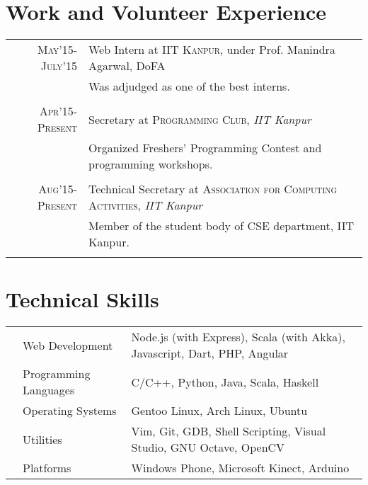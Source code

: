 \documentclass[11pt,a4paper]{article}
\begin{document}
\vspace{-0.6cm}
\section*{Work and Volunteer Experience}
\vspace{-0.2cm}
\bgroup
\def\arraystretch{0.6}
\begin{tabular}{r|p{20cm}}
\textsc{May'15-July'15} & Web Intern at \textsc{IIT Kanpur}, under Prof. Manindra Agarwal, DoFA\\
                        &\footnotesize{Was adjudged as one of the best interns.}\\\multicolumn{2}{c}{} \\
\textsc{Apr'15-Present} & Secretary at \textsc{Programming Club}, \emph{IIT Kanpur}\\
&\footnotesize{Organized Freshers' Programming Contest and programming workshops.}\\\multicolumn{2}{c}{} \\

\textsc{Aug'15-Present} & Technical Secretary at \textsc{Association for Computing Activities}, \emph{IIT Kanpur}\\
&\footnotesize{Member of the student body of CSE department, IIT Kanpur.}\\\multicolumn{2}{c}{} \\

\end{tabular}
\egroup

\vspace{-0.6cm}
\section*{Technical Skills}
\vspace{-0.2cm}
\begin{tabular}{L{0.05cm} L{5cm} l}
  &Web Development 	        &Node.js (with Express), Scala (with Akka), Javascript, Dart, PHP, Angular\\
&Programming Languages      &C/C++, Python, Java, Scala, Haskell\\
&Operating Systems	        &Gentoo Linux, Arch Linux, Ubuntu\\
&Utilities                  &Vim, Git, GDB, Shell Scripting, Visual Studio, GNU Octave, OpenCV\\
&Platforms                  &Windows Phone, Microsoft Kinect, Arduino\\

\end{tabular}
\end{document}
